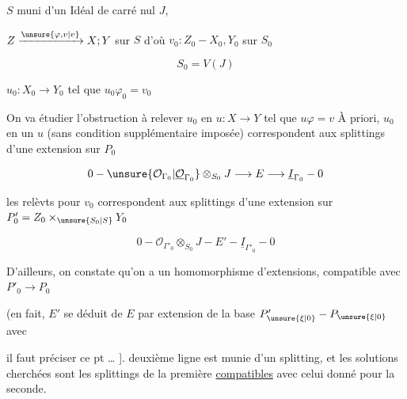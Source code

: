 $S$  muni d'un Idéal  de carré nul $J$,

$Z\xrightarrow{\unsure{\varphi,v|v}}X;Y$ sur $S$ d'où $v_0:Z_0\mathbin{-}X_0,Y_0$ sur $S_0$

\[
S_0=V(J)
\]

$u_0:X_0\to Y_0$ tel que $u_0\varphi_0=v_0$

On va étudier l'obstruction à relever $u_0$ en $u:X\to Y$ tel que $u\varphi=v$ À priori,  $u_0$ en un $u$ (sans condition supplémentaire imposée) correspondent aux splittings d'une extension sur $P_0$

\[
0\mathbin{-}\unsure{\mathcal O_{\Gamma_0}|\underline{\mathcal O}_{\Gamma_0}}\otimes_{S_0}J\longrightarrow E\longrightarrow\underline I_{\Gamma_0}\mathbin{-}0
\]



les relèvts pour $v_0$ correspondent aux splittings d'une extension  sur $P'_0=Z_0\times_{\unsure{S_0|S}}Y_0$

\[
0\mathbin{-}\mathcal O_{\Gamma'_0}\otimes_{S_0}J\mathbin{-}E'\mathbin{-}\underline I_{\Gamma'_0}\mathbin{-}0
\]

D'ailleurs, on constate qu'on a un homomorphisme d'extensions, compatible avec $P'_0\to P_0$


(en fait, $E'$ se déduit de $E$ par extension de la base $P'_{\unsure{\xi|0}}\mathbin{-}P_{\unsure{\xi|0}}$  avec


\unsure{;]|;} il faut préciser ce pt \ldots{} ].  deuxième ligne est munie d'un splitting, et les solutions cherchées sont les splittings de la première \uline{compatibles} avec celui donné pour la seconde.

